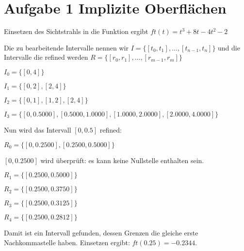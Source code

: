 
\section*{Aufgabe 1 Implizite Oberflächen}

Einsetzen des Sichtstrahls in die Funktion ergibt $ft(t) = t^3+8t-4t^2-2$




Die zu bearbeitende Intervalle nennen wir $I = \{[t_0, t_1],\dots, [t_{n-1}, t_{n}] \}$ und die Intervalle die refined werden $R = \{[r_0, r_1],\dots, [r_{m-1}, r_{m}] \}$

$I_0 = \{[ 0 ,4 ]\}$

$I_1 = \{[0,2],
     [2    ,4 ]\}$

$I_2 = \{[ 0, 1],
     [1   , 2],
     [2   ,  4 ]\}$


$I_3 = \{[ 0  ,  0.5000],
    [0.5000  ,  1.0000],
    [1.0000  ,  2.0000],
    [2.0000  ,  4.0000 ]\}$

\hspace{1.0cm}

Nun wird das Intervall $[0, 0.5]$ refined:

$R_0 = \{[ 0 , 0.2500 ],
    [0.2500  ,0.5000 ] \}$
    

$[ 0 , 0.2500 ]$ wird überprüft: es kann keine Nullstelle enthalten sein.

$R_1 = \{[0.2500, 0.5000] \}$

$R_2 = \{[0.2500, 0.3750] \}$

$R_3 = \{[0.2500,0.3125] \}$

$R_4 = \{[0.2500, 0.2812] \}$

Damit ist ein Intervall gefunden, dessen Grenzen die gleiche erste Nachkommastelle haben. Einsetzen ergibt: $ft(0.25) = -0.2344$.


